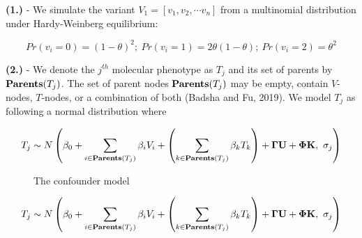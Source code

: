 \documentclass[
]{article}
\begin{document}
\noindent \textbf{(1.)} - We simulate the variant
\(V_1 = [v_1, v_2, \cdots v_n]\) from a multinomial distribution under
Hardy-Weinberg equilibrium:

\[ Pr(v_i = 0) =(1 -\theta)^2; \ Pr(v_i = 1) = 2\theta(1-\theta); \ Pr(v_i = 2) = \theta^2 \]

\noindent \textbf{(2.)} - We denote the \(j^{th}\) molecular phenotype
as \(T_j\) and its set of parents by \({\bf Parents}(T_j)\). The set of
parent nodes \({\bf Parents}(T_j)\) may be empty, contain \(V\)-nodes,
\(T\)-nodes, or a combination of both (Badsha and Fu, 2019). We model
\(T_j\) as following a normal distribution where

\begin{eqnarray}
 T_j \sim N\left( \beta_0 + \sum_{i\in{\bf Parents}(T_j)} \beta_{i} V_i +\left(\sum_{k\in{\bf Parents}(T_j)} \beta_k T_k\right) + {\bf \Gamma U} + {\bf \Phi K}, \ \sigma_j \right)  
\end{eqnarray}

\begin{figure}
\begin{center}
\caption{The confounder model}
\end{center}
\end{figure}

\begin{eqnarray}
 T_j \sim N\left( \beta_0 + \sum_{i\in{\bf Parents}(T_j)} \beta_{i} V_i +\left(\sum_{k\in{\bf Parents}(T_j)} \beta_k T_k\right) + {\bf \Gamma U} + {\bf \Phi K}, \ \sigma_j \right)  
\end{eqnarray}
\end{document}
